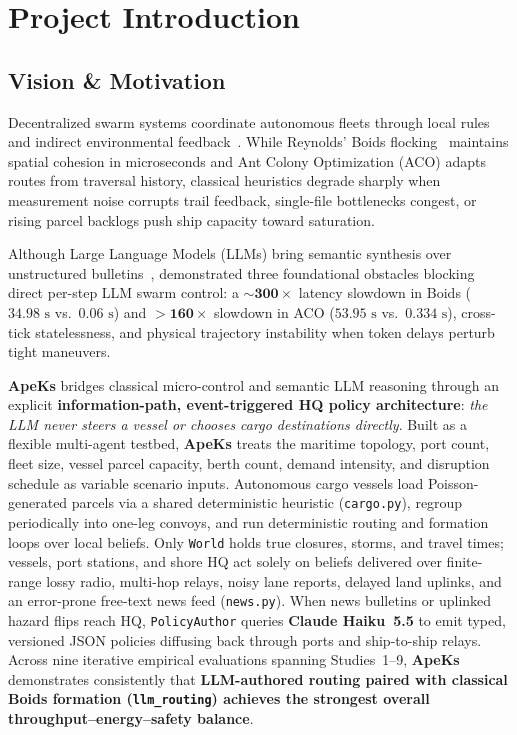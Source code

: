 \documentclass[11pt,a4paper,oneside]{report}
\begin{document}
\chapter[Introduction]{Project Introduction}
\label{cp:introduction}

\parindent0pt

\section{Vision \& Motivation}
Decentralized swarm systems coordinate autonomous fleets through local rules and indirect environmental feedback~\citep{Bonabeau1999,Dorigo2006,Schranz2021}. While Reynolds' Boids flocking~\citep{Reynolds1987} maintains spatial cohesion in microseconds and Ant Colony Optimization (ACO) adapts routes from traversal history, classical heuristics degrade sharply when measurement noise corrupts trail feedback, single-file bottlenecks congest, or rising parcel backlogs push ship capacity toward saturation.

Although Large Language Models (LLMs) bring semantic synthesis over unstructured bulletins~\citep{JimenezRomero2025,OpenAISwarm2024}, \citet{Rahman2026} demonstrated three foundational obstacles blocking direct per-step LLM swarm control: a $\sim \mathbf{300\times}$ latency slowdown in Boids ($34.98\text{ s}$ vs.\ $0.06\text{ s}$) and $> \mathbf{160\times}$ slowdown in ACO ($53.95\text{ s}$ vs.\ $0.334\text{ s}$), cross-tick statelessness, and physical trajectory instability when token delays perturb tight maneuvers.

\textbf{ApeKs} bridges classical micro-control and semantic LLM reasoning through an explicit \textbf{information-path, event-triggered HQ policy architecture}: \emph{the LLM never steers a vessel or chooses cargo destinations directly}. Built as a flexible multi-agent testbed, \textbf{ApeKs} treats the maritime topology, port count, fleet size, vessel parcel capacity, berth count, demand intensity, and disruption schedule as variable scenario inputs. Autonomous cargo vessels load Poisson-generated parcels via a shared deterministic heuristic (\texttt{cargo.py}), regroup periodically into one-leg convoys, and run deterministic routing and formation loops over local beliefs. Only \texttt{World} holds true closures, storms, and travel times; vessels, port stations, and shore HQ act solely on beliefs delivered over finite-range lossy radio, multi-hop relays, noisy lane reports, delayed land uplinks, and an error-prone free-text news feed (\texttt{news.py}). When news bulletins or uplinked hazard flips reach HQ, \texttt{PolicyAuthor} queries \textbf{Claude Haiku~5.5} to emit typed, versioned JSON policies diffusing back through ports and ship-to-ship relays. Across nine iterative empirical evaluations spanning Studies~1--9, \textbf{ApeKs} demonstrates consistently that \textbf{LLM-authored routing paired with classical Boids formation (\texttt{llm\_routing}) achieves the strongest overall throughput--energy--safety balance}.
\end{document}
